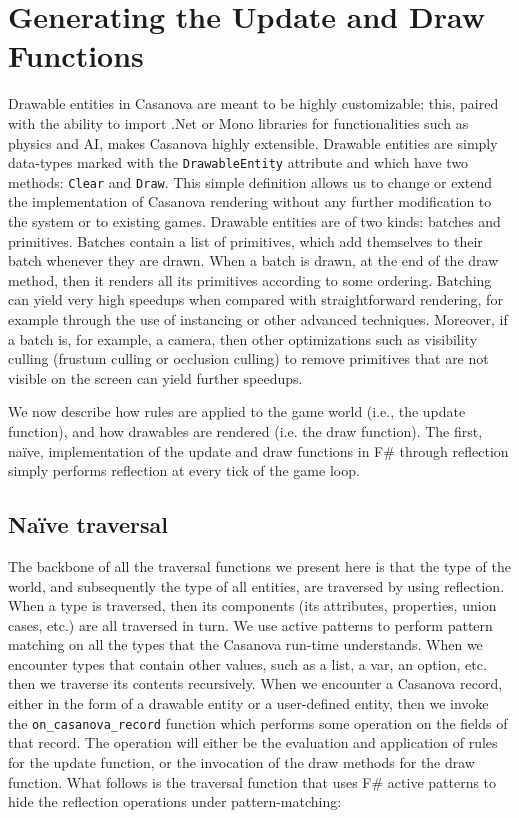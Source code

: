 \section{Generating the Update and Draw Functions}
Drawable entities in Casanova are meant to be highly customizable; this, paired with the ability to import .Net or Mono libraries for functionalities such as physics and AI, makes Casanova highly extensible. Drawable entities are simply data-types marked with the \texttt{DrawableEntity} attribute and which have two methods: \texttt{Clear} and \texttt{Draw}. This simple definition allows us to change or extend the implementation of Casanova rendering without any further modification to the system or to existing games. Drawable entities are of two kinds: batches and primitives. Batches contain a list of primitives, which add themselves to their batch whenever they are drawn. When a batch is drawn, at the end of the draw method, then it renders all its primitives according to some ordering. Batching \cite{GPU_GEMS_2} can yield very high speedups when compared with straightforward rendering, for example through the use of instancing or other advanced techniques. Moreover, if a batch is, for example, a camera, then other optimizations such as visibility culling (frustum culling or occlusion culling) to remove primitives that are not visible on the screen can yield further speedups.

We now describe how rules are applied to the game world (i.e., the update function), and how drawables are rendered (i.e. the draw function). The first, naïve, implementation of the update and draw functions in F\# through reflection simply performs reflection at every tick of the game loop.

\subsection{Naïve traversal}
The backbone of all the traversal functions we present here is that the type of the world, and subsequently the type of all entities, are traversed by using reflection. When a type is traversed, then its components (its attributes, properties, union cases, etc.) are all traversed in turn. We use active patterns to perform pattern matching on all the types that the Casanova run-time understands. When we encounter types that contain other values, such as a list, a var, an option, etc. then we traverse its contents recursively. When we encounter a Casanova record, either in the form of a drawable entity or a user-defined entity, then we invoke the \texttt{on\_casanova\_record} function which performs some operation on the fields of that record. The operation will either be the evaluation and application of rules for the update function, or the invocation of the draw methods for the draw function. What follows is the traversal function that uses F\# active patterns \cite{APPENDIX_F_FSHARP_MSDN, CASANOVA_CODEPLEX} to hide the reflection operations under pattern-matching:

